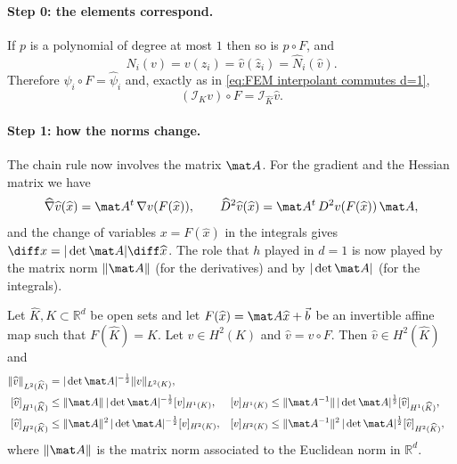 \paragraph{Step 0: the elements correspond.}
If $p$ is a polynomial of degree at most $1$ then so is $p \circ F$, and
\begin{equation*}
    N_i (v) = v(z_i) = \widehat v (\widehat z_i) = \widehat N_i (\widehat v).
\end{equation*}
Therefore $\psi_i \circ F = \widehat \psi_i$ and, exactly as in \eqref{eq:FEM interpolant commutes d=1},
\begin{equation}
    \label{eq:FEM interpolant commutes d=2}
    (\mathcal I_K v) \circ F = \mathcal I_{\widehat K} \widehat v.
\end{equation}

\paragraph{Step 1: how the norms change.}
The chain rule now involves the matrix $\mat A$. For the gradient and the Hessian matrix we have
\begin{equation}
    \label{eq:FEM chain rule}
    \widehat \nabla \widehat v (\widehat x) = \mat A^t\, \nabla v (F (\widehat x)),
    \qquad
    \widehat D^2 \widehat v (\widehat x) = \mat A^t\, D^2 v (F (\widehat x))\, \mat A,
\end{equation}
and the change of variables $x = F(\widehat x)$ in the integrals gives $\diff x = |\det \mat A| \diff \widehat x$.
The role that $h$ played in $d = 1$ is now played by the matrix norm $\|\mat A\|$ (for the derivatives) and by $|\det \mat A|$ (for the integrals).
\begin{lemma}
    \label{lem:FEM affine equivalence Hm norm}
    Let $\widehat K, K \subset \mathbb R^d$ be open sets and let $F(\widehat x) = \mat A \widehat x + \vec b$ be an invertible affine map such that $F(\widehat K) = K$.
    Let $v \in H^2(K)$ and $\widehat v = v \circ F$. Then $\widehat v \in H^2(\widehat K)$ and
    \begin{align*}
        \| \widehat v \|_{L^2(\widehat K)} & = |\det \mat A|^{-\frac 1 2} \| v \|_{L^2(K)},
        \\
        [ \widehat v ]_{H^1(\widehat K)}   & \le \|\mat A\|\, |\det \mat A|^{-\frac 1 2} [ v ]_{H^1(K)},
                                           &
        [ v ]_{H^1(K)}                     & \le \|\mat A^{-1}\|\, |\det \mat A|^{\frac 1 2} [ \widehat v ]_{H^1(\widehat K)},
        \\
        [ \widehat v ]_{H^2(\widehat K)}   & \le \|\mat A\|^2\, |\det \mat A|^{-\frac 1 2} [ v ]_{H^2(K)},
                                           &
        [ v ]_{H^2(K)}                     & \le \|\mat A^{-1}\|^2\, |\det \mat A|^{\frac 1 2} [ \widehat v ]_{H^2(\widehat K)},
    \end{align*}
    where $\| \mat A \|$ is the matrix norm associated to the Euclidean norm in $\mathbb R^d$.
\end{lemma}
